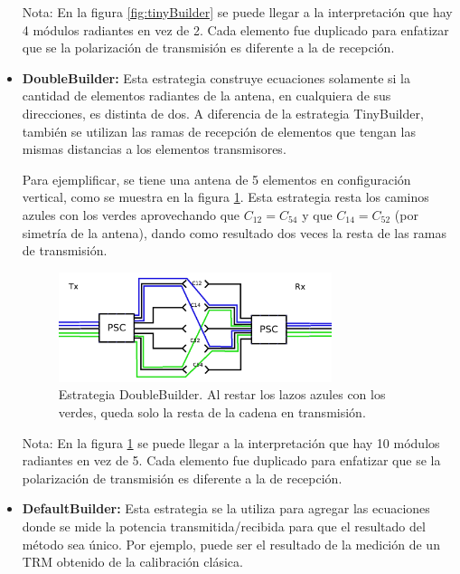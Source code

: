 \begin{itemize}
        Nota: En la figura \ref{fig:tinyBuilder} se puede llegar a la interpretación que hay 4 módulos radiantes en vez 
        de 2. Cada elemento fue duplicado para enfatizar que se la polarización de transmisión es diferente a la de recepción.

	\item \textbf{DoubleBuilder:} Esta estrategia construye ecuaciones solamente si la cantidad de elementos radiantes de la 
        antena, en cualquiera de sus direcciones, es distinta de dos. A diferencia de la estrategia TinyBuilder, también se 
        utilizan las ramas de recepción de elementos que tengan las mismas distancias a los elementos transmisores.
        
        Para ejemplificar, se tiene una antena de 5 elementos en 
        configuración vertical, como se muestra en la figura \ref{fig:doubleBuilder}. Esta estrategia resta los caminos azules 
        con los verdes aprovechando que $C_{12} = C_{54}$ y que $C_{14} = C_{52}$ (por simetría de la antena), dando como 
        resultado dos veces la resta de las ramas de transmisión.
		
		\begin{figure}[H]
		 \centering
		 \includegraphics[width=8cm]{gfx/doubleBuilder.png}
		 \caption{Estrategia DoubleBuilder. Al restar los lazos azules con los verdes, queda solo la resta de la cadena en 
         transmisión.}
		 \label{fig:doubleBuilder}
		\end{figure}

        Nota: En la figura \ref{fig:doubleBuilder} se puede llegar a la interpretación que hay 10 módulos radiantes en vez 
        de 5. Cada elemento fue duplicado para enfatizar que se la polarización de transmisión es diferente a la de recepción.

	\item \textbf{DefaultBuilder:} Esta estrategia se la utiliza para agregar las ecuaciones donde se mide la potencia 
		transmitida/recibida para que el resultado del método sea único. Por ejemplo, puede ser el resultado de la medición de un 
		TRM obtenido de la calibración clásica.
\end{itemize}



